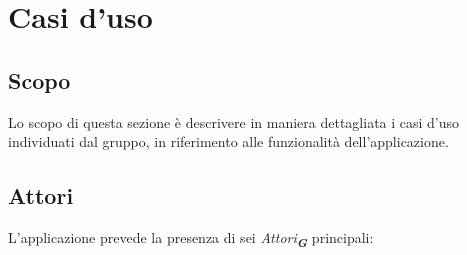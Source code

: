 
\setcounter{secnumdepth}{5} %


\section{Casi d'uso}
\label{sec:casi_uso}

\subsection{Scopo}

Lo scopo di questa sezione è descrivere in maniera dettagliata i casi d’uso individuati dal
gruppo, in riferimento alle funzionalità dell’applicazione.


\subsection{Attori}
\label{sec:attori}

L’applicazione prevede la presenza di sei \emph{Attori}\textsubscript{\textbf{\textit{G}}} principali:

